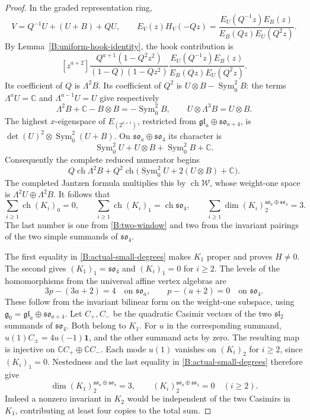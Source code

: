 \documentclass[11pt,a4paper]{amsart}
\numberwithin{equation}{section}
\theoremstyle{definition}
\theoremstyle{remark}
\begin{document}
\begin{proof}
\medskip
In the graded representation ring,
$$
 V=Q^{-1}U+(U+B)+QU,
 \qquad
 E_V(z)H_V(-Qz)
 =\frac{E_U(Q^{-1}z)E_B(z)}{E_B(Qz)E_U(Q^2z)}.
$$
By Lemma~\ref{B:uniform-hook-identity}, the hook contribution is
$$
 [z^{a+2}]\frac{Q^{a+1}(1-Q^2z^2)}{(1-Q)(1-Qz^2)}
       \frac{E_U(Q^{-1}z)E_B(z)}{E_B(Qz)E_U(Q^2z)}.
$$
Its coefficient of $Q$ is $\Lambda^2B$. Its coefficient of $Q^2$ is
$U\otimes B-\operatorname{Sym}^2_0B$: the terms
$\Lambda^aU=\mathbb C$ and $\Lambda^{a-1}U=U$ give respectively
$$
 \Lambda^2B+\mathbb C-B\otimes B
       =-\operatorname{Sym}^2_0B,
 \qquad U\otimes\Lambda^3B=U\otimes B.
$$
The highest $x$-eigenspace of $E_{(2^{a+1})}$, restricted from
$\mathfrak{gl}_a\oplus\mathfrak{so}_{a+4}$, is
$\det(U)^2\otimes\operatorname{Sym}^2_0(U+B)$.
On $\mathfrak{so}_a\oplus\mathfrak{so}_4$ its character is
$$
 \operatorname{Sym}^2_0U+U\otimes B+
       \operatorname{Sym}^2_0B+\mathbb C.
$$
Consequently the complete reduced numerator begins
\begin{equation}\label{B:two-window}
 Q\operatorname{ch}\Lambda^2B+
 Q^2\operatorname{ch}
   \bigl(\operatorname{Sym}^2_0U+2(U\otimes B)+\mathbb C\bigr).
\end{equation}
The completed Jantzen formula multiplies this by
$\operatorname{ch}\mathcal W$, whose weight-one space is
$\Lambda^2U\oplus\Lambda^2B$. It follows that
\begin{equation}\label{B:actual-small-degrees}
 \sum_{i\geq1}\operatorname{ch}(K_i)_0=0,\qquad
 \sum_{i\geq1}\operatorname{ch}(K_i)_1=\operatorname{ch}\mathfrak{so}_4,
 \qquad
 \sum_{i\geq1}\dim (K_i)_2^{\mathfrak{so}_a\oplus\mathfrak{so}_4}=3.
\end{equation}
The last number is one from \eqref{B:two-window} and two
from the invariant pairings of the two simple summands of
$\mathfrak{so}_4$.

\medskip
The first equality in \eqref{B:actual-small-degrees} makes $K_1$
proper and proves $H\ne0$. The second gives
$(K_1)_1=\mathfrak{so}_4$ and $(K_i)_1=0$ for $i\geq2$.
The levels of the homomorphisms from the universal affine vertex algebras are
$$
 3p-(3a+2)=4\quad\text{on }\mathfrak{so}_a,
 \qquad p-(a+2)=0\quad\text{on }\mathfrak{so}_4.
$$
These follow from the invariant bilinear form on the weight-one subspace, using
$\mathfrak g_0=\mathfrak{gl}_a\oplus\mathfrak{so}_{a+4}$.
Let $C_+,C_-$ be the quadratic Casimir vectors of the two
$\mathfrak{sl}_2$ summands of $\mathfrak{so}_4$. Both belong to $K_1$.
For $u$ in the corresponding summand,
$u(1)C_\pm=4u(-1)\mathbf1$, and the other summand acts by zero.
The resulting map is injective on $\mathbb CC_+\oplus\mathbb CC_-$.
Each mode $u(1)$ vanishes on $(K_i)_2$ for $i\geq2$, since
$(K_i)_1=0$. Nestedness and the last equality in
\eqref{B:actual-small-degrees} therefore give
$$
 \dim(K_1)_2^{\mathfrak{so}_a\oplus\mathfrak{so}_4}=3,
 \qquad (K_i)_2^{\mathfrak{so}_a\oplus\mathfrak{so}_4}=0\quad(i\geq2).
$$
Indeed a nonzero invariant in $K_2$ would be independent of the two
Casimirs in $K_1$, contributing at least four copies to the total sum.


\end{proof}
\end{document}
